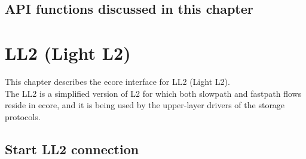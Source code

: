 \documentclass[11pt,fleqn,hidelinks,oneside]{book} %
\newcommand{\insertcode}[2]{\begin{itemize}\item[]\end{itemize}} %
\newcommand{\ChapterFuncs}{}
\newcommand{\silentfunc}[1]
{\expandafter\def\expandafter\ChapterFuncs\expandafter{\ChapterFuncs { } \insertcode{snippets/#1_generated.h}{}}}
\newenvironment{bottompar}{\par\vspace*{\fill}}{\clearpage}
\newcommand{\SpillChapterFuncs}%
{%
\section{API functions discussed in this chapter}
\ChapterFuncs{}%
\renewcommand{\ChapterFuncs}{}}
\begin{document}
\SpillChapterFuncs

\chapter{LL2 (Light L2)}
\label{cha:ll2}

This chapter describes the ecore interface for LL2 (Light L2). \\
The LL2 is a simplified version of L2 for which both slowpath and fastpath flows reside in ecore, and it is being used by the upper-layer drivers of the storage protocols.

\section{Start LL2 connection}
\silentfunc{ll2_acquire_connection}
\silentfunc{ll2_establish_connection}
\end{document}
